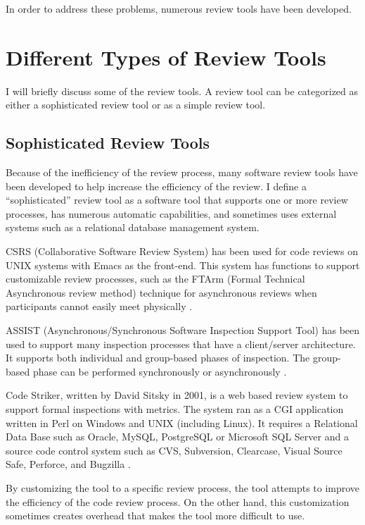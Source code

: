 In order to address these problems, numerous review tools have been developed.

\section{Different Types of Review Tools}
\label{sec:different-types-of-review-tools}

I will briefly discuss some of the review tools. A review tool can be categorized as either a sophisticated review tool or as a simple review tool.

\subsection{Sophisticated Review Tools}
\label{subsec:sophisticated-review-tools}

Because of the inefficiency of the review process, many software review tools have been developed to help increase the efficiency of the review. I define a ``sophisticated'' review tool as a software tool that supports one or more review processes, has numerous automatic capabilities, and sometimes uses external systems such as a relational database management system.

CSRS (Collaborative Software Review System) has been used for code reviews on UNIX systems with Emacs as the front-end. This system has functions to support customizable review processes, such as the FTArm (Formal Technical Asynchronous review method) technique for asynchronous reviews when participants cannot easily meet physically \cite{johnson:instrumented}.

ASSIST (Asynchronous/Synchronous Software Inspection Support Tool) has been used to support many inspection processes that have a client/server architecture. It supports both individual and group-based phases of inspection. The group-based phase can be performed synchronously or asynchronously \cite{macdonald:comparison}.

Code Striker, written by David Sitsky in 2001, is a web based review system to support formal inspections with metrics. The system ran as a CGI application written in Perl on Windows and UNIX (including Linux). It requires a Relational Data Base such as Oracle, MySQL, PostgreSQL or Microsoft SQL Server and a source code control system such as CVS, Subversion, Clearcase, Visual Source Safe, Perforce, and Bugzilla \cite{jason:source}.

By customizing the tool to a specific review process, the tool attempts to improve the efficiency of the code review process. On the other hand, this customization sometimes creates overhead that makes the tool more difficult to use.

